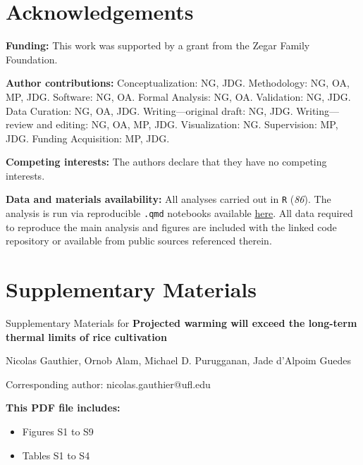 \documentclass[
  letterpaper,
  DIV=11,
  numbers=noendperiod]{scrartcl}
\begin{document}
\section{Acknowledgements}\label{acknowledgements}

\textbf{Funding:} This work was supported by a grant from the Zegar
Family Foundation.

\textbf{Author contributions:} Conceptualization: NG, JDG. Methodology:
NG, OA, MP, JDG. Software: NG, OA. Formal Analysis: NG, OA. Validation:
NG, JDG. Data Curation: NG, OA, JDG. Writing---original draft: NG, JDG.
Writing---review and editing: NG, OA, MP, JDG. Visualization: NG.
Supervision: MP, JDG. Funding Acquisition: MP, JDG.

\textbf{Competing interests:} The authors declare that they have no
competing interests.

\textbf{Data and materials availability:} All analyses carried out in
\texttt{R} (\emph{86}). The analysis is run via reproducible
\texttt{.qmd} notebooks available
\href{https://github.com/nick-gauthier/rice}{here}. All data required to
reproduce the main analysis and figures are included with the linked
code repository or available from public sources referenced therein.

\newpage{}

\newpage
\appendix
\renewcommand{\thefigure}{S\arabic{figure}}
\renewcommand{\thetable}{S\arabic{table}}
\setcounter{figure}{0}
\setcounter{table}{0}

\section{Supplementary Materials}\label{supplementary-materials}

Supplementary Materials for \textbf{Projected warming will exceed the
long-term thermal limits of rice cultivation}

Nicolas Gauthier, Ornob Alam, Michael D. Purugganan, Jade d'Alpoim
Guedes

Corresponding author: nicolas.gauthier@ufl.edu

\textbf{This PDF file includes:}

\begin{itemize}
\item
  Figures S1 to S9
\item
  Tables S1 to S4
\end{itemize}

\newpage{}
\end{document}
